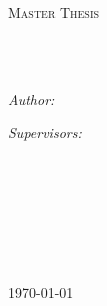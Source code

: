 \documentclass[
11pt, %
english, %
singlespacing, %
nolistspacing, %
liststotoc, %
headsepline, %
]{MastersDoctoralThesis} %
\author{Benoît \textsc{Richard}} %
\begin{document}
\frontmatter %

\pagestyle{plain} %


\begin{titlepage}
\begin{center}

\vspace*{.06\textheight}
{\scshape\LARGE \univname\par}\vspace{1.5cm} %
\textsc{\Large Master Thesis}\\[0.5cm] %

\HRule \\[0.4cm] %
{\huge \bfseries \ttitle\par}\vspace{0.4cm} %
\HRule \\[1.5cm] %
 
\begin{minipage}[t]{0.4\textwidth}
\begin{flushleft} \large
\textit{Author:}\\
\authorname
\end{flushleft}
\end{minipage}
\begin{minipage}[t]{0.4\textwidth}
\begin{flushright} \large
\textit{Supervisors:} \\
\supname
\end{flushright}
\end{minipage}\\[3cm]
 
\vfill

\large \textit{}\\[0.3cm] %
\textit{}\\[0.4cm]
\groupname\\\deptname\\[2cm] %
 
\vfill

{\large \today}\\[4cm] %
 
\vfill
\end{center}
\end{titlepage}
\end{document}
